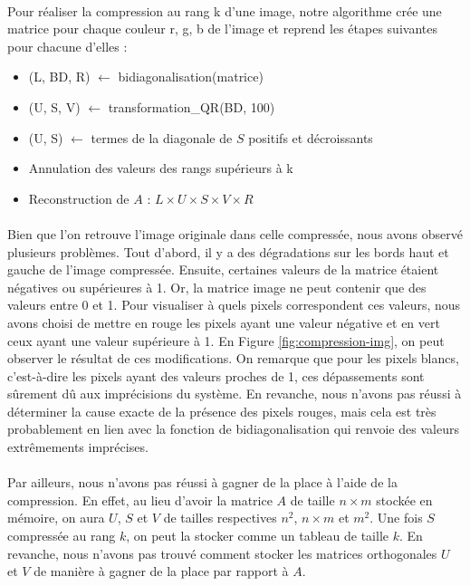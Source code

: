 \documentclass{article}
\begin{document}
\paragraph{}
Pour réaliser la compression au rang k d'une image, notre algorithme crée une matrice pour chaque couleur r, g, b de l'image et reprend les étapes suivantes pour chacune d'elles :
\begin{itemize}
    \item (L, BD, R) $\leftarrow$ bidiagonalisation(matrice)
    \item (U, S, V) $\leftarrow$ transformation\_QR(BD, 100) 
    \item (U, S) $\leftarrow$ termes de la diagonale de $S$ positifs et décroissants
    \item Annulation des valeurs des rangs supérieurs à k
    \item Reconstruction de $A$ : $L \times U \times S \times V \times R$
\end{itemize}
\paragraph{}
Bien que l'on retrouve l'image originale dans celle compressée, nous avons observé plusieurs problèmes. Tout d'abord, il y a des dégradations sur les bords haut et gauche de l'image compressée. Ensuite, certaines valeurs de la matrice étaient négatives ou supérieures à 1. Or, la matrice image ne peut contenir que des valeurs entre 0 et 1. Pour visualiser à quels pixels correspondent ces valeurs, nous avons choisi de mettre en rouge les pixels ayant une valeur négative et en vert ceux ayant une valeur supérieure à 1. En Figure \ref{fig:compression-img}, on peut observer le résultat de ces modifications. On remarque que pour les pixels blancs, c'est-à-dire les pixels ayant des valeurs proches de 1, ces dépassements sont sûrement dû aux imprécisions du système. En revanche, nous n'avons pas réussi à déterminer la cause exacte de la présence des pixels rouges, mais cela est très probablement en lien avec la fonction de bidiagonalisation qui renvoie des valeurs extrêmements imprécises. 

\paragraph{}
Par ailleurs, nous n'avons pas réussi à gagner de la place à l'aide de la compression. En effet, au lieu d'avoir la matrice $A$ de taille $n \times m$ stockée en mémoire, on aura $U$, $S$ et $V$ de tailles respectives $n^2$, $n \times m$ et $m^2$. Une fois $S$ compressée au rang $k$, on peut la stocker comme un tableau de taille $k$. En revanche, nous n'avons pas trouvé comment stocker les matrices orthogonales $U$ et $V$ de manière à gagner de la place par rapport à $A$.
\end{document}
